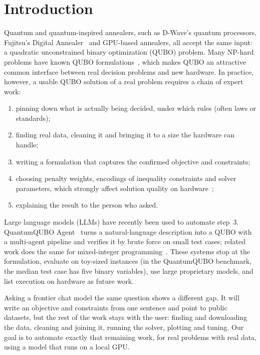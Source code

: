 \section{Introduction}
\label{sec:intro}

Quantum and quantum-inspired annealers, such as D-Wave's quantum processors, Fujitsu's Digital
Annealer~\citep{aramon2019digital} and GPU-based annealers, all accept the same input: a quadratic unconstrained
binary optimization (QUBO) problem. Many NP-hard problems have known QUBO formulations~\citep{lucas2014ising,
glover2019tutorial}, which makes QUBO an attractive common interface between real decision problems and new
hardware. In practice, however, a usable QUBO solution of a real problem requires a chain of expert work:
\begin{enumerate}
  \item pinning down what is actually being decided, under which rules (often laws or standards);
  \item finding real data, cleaning it and bringing it to a size the hardware can handle;
  \item writing a formulation that captures the confirmed objective and constraints;
  \item choosing penalty weights, encodings of inequality constraints and solver parameters, which strongly
        affect solution quality on hardware~\citep{verma2020penalty,ayodele2022penalty,pelofske2025comparing};
  \item explaining the result to the person who asked.
\end{enumerate}

Large language models (LLMs) have recently been used to automate step~3. QuantumQUBO
Agent~\citep{mondal2026quantumqubo} turns a natural-language description into a QUBO with a multi-agent pipeline
and verifies it by brute force on small test cases; related work does the same for mixed-integer
programming~\citep{ramamonjison2023nl4opt,ahmaditeshnizi2024optimus,xiao2024chainofexperts}. These systems stop at
the formulation, evaluate on toy-sized instances (in the QuantumQUBO benchmark, the median test case has five
binary variables), use large proprietary models, and list execution on hardware as future work.

Asking a frontier chat model the same question shows a different gap. It will write an objective and
constraints from one sentence and point to public datasets, but the rest of the work stays with the user: finding
and downloading the data, cleaning and joining it, running the solver, plotting and tuning. Our goal is to
automate exactly that remaining work, for real problems with real data, using a model that runs on a local GPU.


